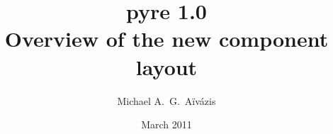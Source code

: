\documentclass[10pt,compress]{beamer}
\title[pyre 1.0 -- March 2011]{pyre 1.0 \\ Overview of the new component layout}
\author{Michael A.~G.~A\"iv\'azis}
\institute{California Institute of Technology}
\date{March 2011}
\begin{document}
\begin{frame}
  \titlepage
\end{frame}



% 
% 
\end{document}
